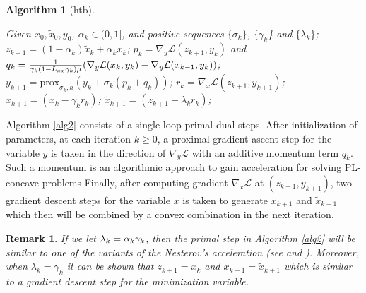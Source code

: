 \documentclass[letterpaper,11 pt]{article}
\newtheorem{algorithm}{Algorithm}
\newtheorem{remark}{Remark}
\def\ml{\mathcal L}
\newcommand{\zizi}[1]{{\color{black}#1}}
\begin{document}
\begin{algorithm}[htb]
\caption{ Primal-Dual with Momentum (PDM)}
 \label{alg2}
\begin{algorithmic}[1]
   \STATE Given $x_0, \tilde x_0,y_0$, $\alpha_k\in(0,1]$, and positive sequences $\{\sigma_k\}$, $\{\gamma_k$\} and $\{\lambda_k\}$;
   \STATE\label{update z2} $z_{k+1} =(1-\alpha_k)\tilde x_{k} +\alpha_kx_{k}$;
   \STATE \label{update p,q2} $p_k=\nabla_y \ml{(z_{k+1},y_{k})}$ and $q_k={1\over \gamma_k(1-L_{xx}\gamma_k) \mu}(\nabla_y\ml{(x_{k},y_{k})}-\nabla_y\ml{(x_{k-1},y_{k})})$;
   \STATE\label{update y2} $y_{k+1}= \mbox{prox}_{\sigma_{k},h}\left(y_{k}+\sigma_k (p_k+ q_k)\right)$;
   \STATE\label{update r2} $r_k=\nabla_x \ml(z_{k+1},y_{k+1})$;
   \STATE\label{update x2} $x_{k+1}= \left(x_k -\gamma_k r_k\right)$;
   \STATE\label{update tilde x2} $\tilde x_{k+1}=(z_{k+1}-\lambda_k r_k)$;
   \ENDFOR
\end{algorithmic}
\end{algorithm}
Algorithm \ref{alg2} consists of a single loop primal-dual steps. After initialization of parameters, 
at each iteration $k\geq 0$, a proximal gradient  ascent step for the variable $y$ is taken in the direction of $\nabla_y \ml$ with an additive momentum term $q_k$. Such a momentum is an algorithmic approach to gain acceleration for solving PL-concave problems %
Finally, after computing gradient $\nabla_x\ml$ at $(z_{k+1},y_{k+1})$, two gradient descent steps for the variable $x$ is taken to generate $x_{k+1}$ and $\tilde x_{k+1}$ which then will be combined by a convex combination in the next iteration. 

\begin{remark}
If we let $\lambda_k=\alpha_k\zizi{\gamma_k}$, then the primal step in Algorithm \ref{alg2} will be similar to one of the variants of the Nesterov’s acceleration (see \cite{nesterov2003introductory} and \cite{ghadimi2016accelerated}). Moreover, when $\lambda_k=\gamma_k$ it can be shown that $z_{k+1}=x_k$ and $x_{k+1}=\tilde x_{k+1}$ which is similar to a gradient descent step for the minimization variable. 
\end{remark}
\end{document}
